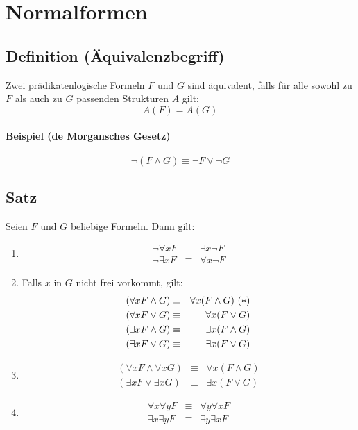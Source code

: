 \documentclass[a4paper]{scrartcl}
\begin{document}
\section{Normalformen}

\subsection{Definition (Äquivalenzbegriff)}

Zwei prädikatenlogische Formeln $F$ und $G$ sind äquivalent, falls für alle sowohl zu $F$ als auch zu $G$ passenden Strukturen $A$ gilt: $$A(F) = A(G)$$

\paragraph{Beispiel (de Morgansches Gesetz)} \[\neg (F \wedge G) \equiv \neg F \vee \neg G\]

\subsection{Satz}

Seien $F$ und $G$ beliebige Formeln. Dann gilt:
\begin{enumerate}
\item
\begin{eqnarray*}
	\neg \forall xF & \equiv & \exists x\neg F \\
	\neg \exists xF & \equiv & \forall x\neg F
\end{eqnarray*}
\item Falls $x$ in $G$ nicht frei vorkommt, gilt:
\begin{eqnarray*}
	(\forall xF\wedge G) & \equiv & \forall x(F\wedge G) \hfill ~(*) \\
	(\forall xF\vee G) & \equiv & \forall x(F\vee G) \\
	(\exists xF\wedge G) & \equiv & \exists x(F \wedge G) \\
	(\exists xF\vee G) & \equiv & \exists x(F \vee G)
\end{eqnarray*}
\item
\begin{eqnarray*}
	(\forall xF \wedge \forall xG) & \equiv & \forall x(F \wedge G) \\
	(\exists xF \vee \exists xG) & \equiv & \exists x(F \vee G)
\end{eqnarray*}
\item
\begin{eqnarray*}
	\forall x\forall yF & \equiv & \forall y\forall xF \\
	\exists x\exists yF & \equiv & \exists y\exists xF
\end{eqnarray*}
\end{enumerate}
\end{document}

